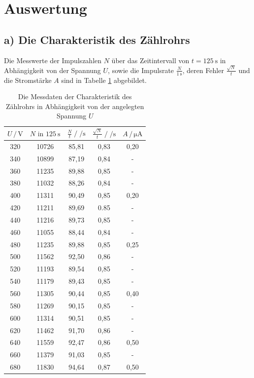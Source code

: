 \section{Auswertung}
\label{sec:Auswertung}

\subsection{a) Die Charakteristik des Zählrohrs}

Die Messwerte der Impulszahlen $N$ über das Zeitintervall
von $t = \SI{125}{\second}$ in Abhängigkeit von der Spannung $U$, 
sowie die Impulsrate $\frac{N}{\SI{1}{\second}}$, deren Fehler
$\frac{\sqrt{N}}{t}$ und die Stromstärke $A$ sind in Tabelle \ref{tab:mess} abgebildet.

\begin{table}
  \centering
  \caption{Die Messdaten der Charakteristik des Zählrohrs in Abhängigkeit 
            von der angelegten Spannung $U$}
  \label{tab:mess}
  \begin{tabular}{c c c c c}
  \toprule
  $U \,/\, \si{\volt}$ & $N \text{ in } \SI{125}{\second}$ & 
  $\frac{N}{t} \;/\; \si{\per\second}$
  & $\frac{\sqrt{N}}{t} \;/\; \si{\per\second}$ & $A \,/\, \si{\micro\ampere}$\\
  \midrule 
  320 & 10726 & 85,81 & 0,83 & 0,20 \\
  340 & 10899 & 87,19 & 0,84 &  - \\
  360 & 11235 & 89,88 & 0,85 &  - \\
  380 & 11032 & 88,26 & 0,84 &  - \\
  400 & 11311 & 90,49 & 0,85 & 0,20 \\
  420 & 11211 & 89,69 & 0.85 &  - \\
  440 & 11216 & 89,73 & 0,85 &  - \\
  460 & 11055 & 88,44 & 0,84 &  - \\
  480 & 11235 & 89,88 & 0,85 & 0,25 \\
  500 & 11562 & 92,50 & 0,86 &  - \\
  520 & 11193 & 89,54 & 0,85 &  - \\
  540 & 11179 & 89,43 & 0,85 &  - \\
  560 & 11305 & 90,44 & 0,85 & 0,40 \\
  580 & 11269 & 90,15 & 0,85 &  - \\
  600 & 11314 & 90,51 & 0,85 &  - \\
  620 & 11462 & 91,70 & 0,86 &  - \\
  640 & 11559 & 92,47 & 0,86 & 0,50 \\
  660 & 11379 & 91,03 & 0,85 &  -  \\
  680 & 11830 & 94,64 & 0,87 & 0,50 \\
  \bottomrule
  \end{tabular}
  \end{table}

